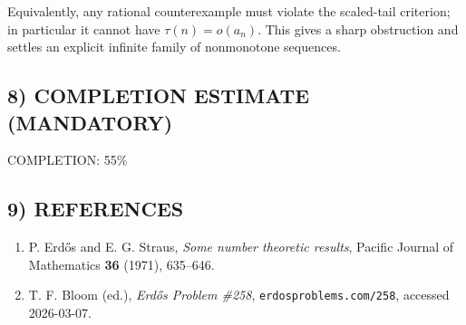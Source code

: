 Equivalently, any rational counterexample must violate the scaled-tail criterion; in particular it cannot have $\tau(n)=o(a_n)$. This gives a sharp obstruction and settles an explicit infinite family of nonmonotone sequences.

\subsection*{8) COMPLETION ESTIMATE (MANDATORY)}
COMPLETION: 55\%

\subsection*{9) REFERENCES}
\begin{enumerate}
\item P. Erd\H{o}s and E. G. Straus, \emph{Some number theoretic results}, Pacific Journal of Mathematics \textbf{36} (1971), 635--646.
\item T. F. Bloom (ed.), \emph{Erd\H{o}s Problem \#258}, \texttt{erdosproblems.com/258}, accessed 2026-03-07.
\end{enumerate}
